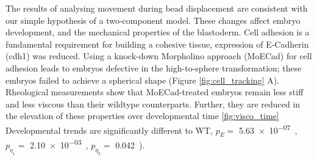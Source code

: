 The results of analysing %
movement during bead displacement are consistent with our simple hypothesis of a two-component model.
These changes affect embryo development, %
and the mechanical properties of the blastoderm.
Cell adhesion is a fundamental requirement for building a cohesive tissue, expression of E-Cadherin (cdh1) was reduced.
Using a knock-down Morpholino approach (MoECad) for cell adhesion leads to embryos defective in the high-to-sphere transformation; these embryos failed to achieve a spherical shape (Figure \ref{fig:cell_tracking} A).
Rheological measurements show that MoECad-treated embryos remain less stiff and less viscous than their wildtype counterparts.
Further, they are reduced in the elevation of these properties over developmental time \ref{fig:visco_time}
Developmental trends are significantly different to WT, $p_E =$ \SI{5.63e-07} , $p_{\eta_1} =$ \SI{2.10e-03}, $p_{\eta_2} =$ \SI{0.042}).

